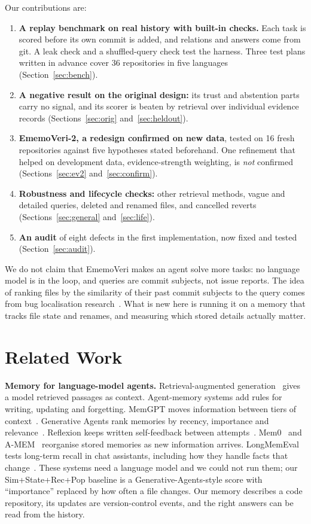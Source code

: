 \documentclass[conference]{IEEEtran}
\newcommand{\sys}{EmemoVeri}
\begin{document}
\noindent Our contributions are:
\begin{enumerate}
\item \textbf{A replay benchmark on real history with built-in checks.} Each task is scored before its own commit is added, and relations and answers come from git. A leak check and a shuffled-query check test the harness. Three test plans written in advance cover 36 repositories in five languages (Section~\ref{sec:bench}).
\item \textbf{A negative result on the original design:} its trust and abstention parts carry no signal, and its scorer is beaten by retrieval over individual evidence records (Sections~\ref{sec:orig} and~\ref{sec:heldout}).
\item \textbf{\sys{}-2, a redesign confirmed on new data}, tested on 16 fresh repositories against five hypotheses stated beforehand. One refinement that helped on development data, evidence-strength weighting, is \emph{not} confirmed (Sections~\ref{sec:ev2} and~\ref{sec:confirm}).
\item \textbf{Robustness and lifecycle checks:} other retrieval methods, vague and detailed queries, deleted and renamed files, and cancelled reverts (Sections~\ref{sec:general} and~\ref{sec:life}).
\item \textbf{An audit} of eight defects in the first implementation, now fixed and tested (Section~\ref{sec:audit}).
\end{enumerate}
We do not claim that \sys{} makes an agent solve more tasks: no language model is in the loop, and queries are commit subjects, not issue reports. The idea of ranking files by the similarity of their past commit subjects to the query comes from bug localisation research~\cite{zhou2012buglocator}. What is new here is running it on a memory that tracks file state and renames, and measuring which stored details actually matter.

\section{Related Work}
\textbf{Memory for language-model agents.} Retrieval-augmented generation~\cite{lewis2020rag} gives a model retrieved passages as context. Agent-memory systems add rules for writing, updating and forgetting. MemGPT moves information between tiers of context~\cite{packer2023memgpt}. Generative Agents rank memories by recency, importance and relevance~\cite{park2023generative}. Reflexion keeps written self-feedback between attempts~\cite{shinn2023reflexion}. Mem0~\cite{chhikara2025mem0} and A-MEM~\cite{xu2025amem} reorganise stored memories as new information arrives. LongMemEval tests long-term recall in chat assistants, including how they handle facts that change~\cite{wu2024longmemeval}. These systems need a language model and we could not run them; our Sim+State+Rec+Pop baseline is a Generative-Agents-style score with ``importance'' replaced by how often a file changes. Our memory describes a code repository, its updates are version-control events, and the right answers can be read from the history.
\end{document}

